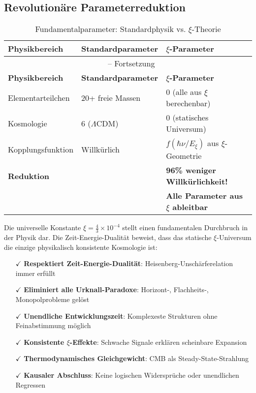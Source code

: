 \documentclass[12pt,a4paper]{article}
\theoremstyle{definition}
\begin{document}
	\subsection{Revolutionäre Parameterreduktion}
	
	\begin{longtable}{lll}
		\caption{Fundamentalparameter: Standardphysik vs. $\xi$-Theorie} \\
		\toprule
		\textbf{Physikbereich} & \textbf{Standardparameter} & \textbf{$\xi$-Parameter} \\
		\midrule
		\endfirsthead
		\multicolumn{3}{c}{\tablename\ \thetable{} -- Fortsetzung} \\
		\toprule
		\textbf{Physikbereich} & \textbf{Standardparameter} & \textbf{$\xi$-Parameter} \\
		\midrule
		\endhead
		Elementarteilchen & 20+ freie Massen & 0 (alle aus $\xi$ berechenbar) \\
		Kosmologie & 6 ($\Lambda$CDM) & 0 (statisches Universum) \\
		Kopplungsfunktion & Willkürlich & $f(\hbar\nu/E_\xi)$ aus $\xi$-Geometrie \\
		\midrule
		\textbf{Reduktion} & & \textbf{96\% weniger Willkürlichkeit!} \\
		& & \textbf{Alle Parameter aus $\xi$ ableitbar} \\
		\bottomrule
	\end{longtable}
	
	\begin{revolutionary}
		Die universelle Konstante $\xi = \frac{4}{3} \times 10^{-4}$ stellt einen fundamentalen Durchbruch in der Physik dar. Die Zeit-Energie-Dualität beweist, dass das statische $\xi$-Universum die einzige physikalisch konsistente Kosmologie ist:
		
		\begin{itemize}
			\item[$\checkmark$] \textbf{Respektiert Zeit-Energie-Dualität}: Heisenberg-Unschärferelation immer erfüllt
			\item[$\checkmark$] \textbf{Eliminiert alle Urknall-Paradoxe}: Horizont-, Flachheits-, Monopolprobleme gelöst
			\item[$\checkmark$] \textbf{Unendliche Entwicklungszeit}: Komplexeste Strukturen ohne Feinabstimmung möglich
			\item[$\checkmark$] \textbf{Konsistente $\xi$-Effekte}: Schwache Signale erklären scheinbare Expansion
			\item[$\checkmark$] \textbf{Thermodynamisches Gleichgewicht}: CMB als Steady-State-Strahlung
			\item[$\checkmark$] \textbf{Kausaler Abschluss}: Keine logischen Widersprüche oder unendlichen Regressen
		\end{itemize}
	\end{revolutionary}
	
\end{document}
